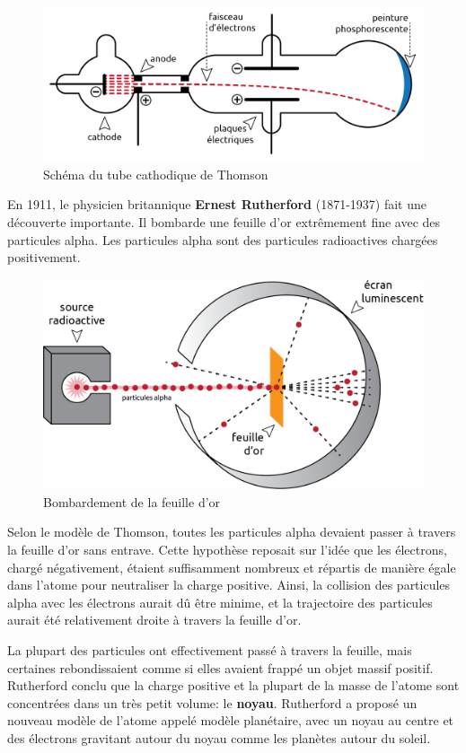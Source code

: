 \documentclass[
  11pt,
  a4paper,
  openany]{book}
\begin{document}
\begin{figure}

{\centering \includegraphics[width=0.4\linewidth]{images/exp-thomson} 

}

\caption{Schéma du tube cathodique de Thomson}\label{fig:exp-thomson}
\end{figure}

En 1911, le physicien britannique \textbf{Ernest Rutherford} (1871-1937) fait une découverte importante. Il bombarde une feuille d'or extrêmement fine avec des particules alpha. Les particules alpha sont des particules radioactives chargées positivement.

\begin{figure}

{\centering \includegraphics[width=0.4\linewidth]{images/exp-rutherford} 

}

\caption{Bombardement de la feuille d'or}\label{fig:exp-rutherford}
\end{figure}

Selon le modèle de Thomson, toutes les particules alpha devaient passer à travers la feuille d'or sans entrave. Cette hypothèse reposait sur l'idée que les électrons, chargé négativement, étaient suffisamment nombreux et répartis de manière égale dans l'atome pour neutraliser la charge positive. Ainsi, la collision des particules alpha avec les électrons aurait dû être minime, et la trajectoire des particules aurait été relativement droite à travers la feuille d'or.

La plupart des particules ont effectivement passé à travers la feuille, mais certaines rebondissaient comme si elles avaient frappé un objet massif positif. Rutherford conclu que la charge positive et la plupart de la masse de l'atome sont concentrées dans un très petit volume: le \textbf{noyau}. Rutherford a proposé un nouveau modèle de l'atome appelé modèle planétaire, avec un noyau au centre et des électrons gravitant autour du noyau comme les planètes autour du soleil.
\end{document}
